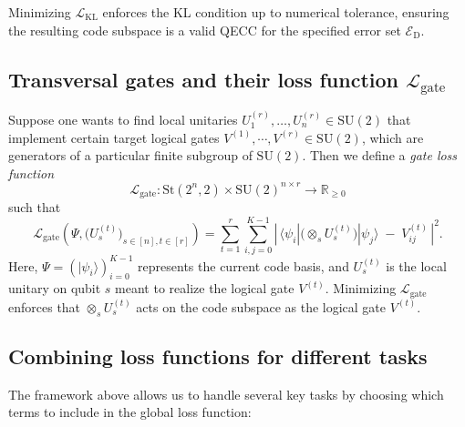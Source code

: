 \documentclass[8pt]{article}
\theoremstyle{definition}
\newcommand{\edset}{\mathcal{E}_\textrm{D}}
\begin{document}
Minimizing \(\mathcal{L}_{\mathrm{KL}}\) enforces the KL condition up to numerical tolerance, ensuring the resulting code subspace is a valid QECC for the specified error set \(\edset\).


\subsection{Transversal gates and their loss function \(\mathcal{L}_{\mathrm{gate}}\)}
Suppose one wants to find local unitaries \(U_1^{(r)},\ldots,U_n^{(r)}\in \mathrm{SU}(2)\) that implement certain target logical gates \(V^{(1)}, \cdots, V^{(r)} \in \mathrm{SU}(2)\), which are generators of a particular finite subgroup of $\mathrm{SU}(2)$. Then we define a \emph{gate loss function} $$\mathcal{L}_{\mathrm{gate}}: \mathrm{St}\left(2^n,2\right) \times \mathrm{SU}(2)^{n\times r} \rightarrow \mathbb{R}_{\ge 0}$$ such that
\begin{equation}
    \label{eq:Lgate}
    \mathcal{L}_{\mathrm{gate}}\left(\Psi,  \bigl(U^{(t)}_s\bigr)_{s\in[n], t\in[r]} \right)
    =
    \sum_{t=1}^r
    \sum_{i,j=0}^{K-1}
    \left|\,
    \langle \psi_i| \bigl(\otimes_{s}U_s^{(t)}\bigr)|\psi_j\rangle
    \;-\;
    V^{(t)}_{ij}
    \,\right|^2.
\end{equation}
Here, \(\Psi = (|\psi_i\rangle)_{i=0}^{K-1}\) represents the current code basis, and \(U_s^{(t)}\) is the local unitary on qubit \(s\) meant to realize the logical gate \(V^{(t)}\). Minimizing \(\mathcal{L}_{\mathrm{gate}}\) enforces that \(\otimes_s U_s^{(t)}\) acts on the code subspace as the logical gate \(V^{(t)}\).

\subsection{Combining loss functions for different tasks}\label{sec:combine-loss}

The framework above allows us to handle several key tasks by choosing which terms to include in the global loss function:
\end{document}
